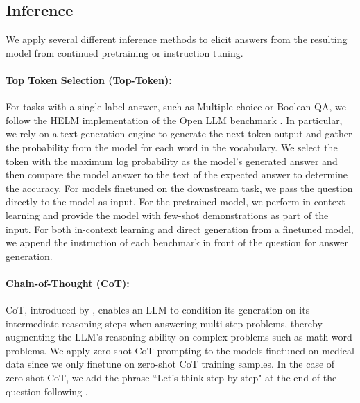 \documentclass{article}
\begin{document}
\subsection{Inference}
We apply several different inference methods to elicit answers from the resulting model from continued pretraining or instruction tuning. 

\paragraph{Top Token Selection (Top-Token):} For tasks with a single-label answer, such as Multiple-choice or Boolean QA, we follow the HELM implementation \citep{liang2023holistic} of the Open LLM benchmark \citep{open-llm}. In particular, we rely on a text generation engine to generate the next token output and gather the probability from the model for each word in the vocabulary. We select the token with the maximum log probability as the model's generated answer and then compare the model answer to the text of the expected answer to determine the accuracy. For models finetuned on the downstream task, we pass the question directly to the model as input. For the pretrained model, we perform in-context learning \citep{xie2022explanation} and provide the model with few-shot demonstrations as part of the input. For both in-context learning and direct generation from a finetuned model, we append the instruction of each benchmark in front of the question for answer generation.

\paragraph{Chain-of-Thought (CoT):} CoT, introduced by \citet{wei2023chainofthought}, enables an LLM to condition its generation on its intermediate reasoning steps when answering multi-step problems, thereby augmenting the LLM's reasoning ability on complex problems such as math word problems. 
We apply zero-shot CoT prompting to the models finetuned on medical data since we only finetune on zero-shot CoT training samples. In the case of zero-shot CoT, we add the phrase ``Let's think step-by-step" at the end of the question following \citet{kojima2023large}.
\end{document}
